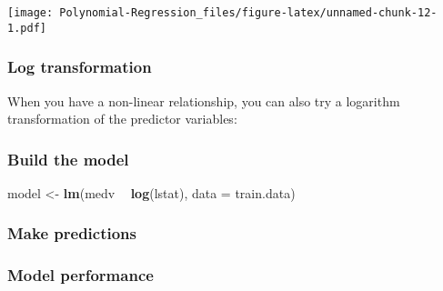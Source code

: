 \documentclass[]{article}
\newenvironment{Shaded}{\begin{snugshade}}{\end{snugshade}}
\newcommand{\DataTypeTok}[1]{\textcolor[rgb]{0.13,0.29,0.53}{#1}}
\newcommand{\KeywordTok}[1]{\textcolor[rgb]{0.13,0.29,0.53}{\textbf{#1}}}
\newcommand{\NormalTok}[1]{#1}
\newcommand{\OperatorTok}[1]{\textcolor[rgb]{0.81,0.36,0.00}{\textbf{#1}}}
\newcommand{\StringTok}[1]{\textcolor[rgb]{0.31,0.60,0.02}{#1}}
\begin{document}
\texttt{[image: Polynomial-Regression\_files/figure-latex/unnamed-chunk-12-1.pdf]}

\hypertarget{log-transformation}{%
\subsubsection{Log transformation}\label{log-transformation}}

When you have a non-linear relationship, you can also try a logarithm
transformation of the predictor variables:

\hypertarget{build-the-model}{%
\subsubsection{Build the model}\label{build-the-model}}

\begin{Shaded}
\begin{Highlighting}[]
\NormalTok{model <-}\StringTok{ }\KeywordTok{lm}\NormalTok{(medv }\OperatorTok{~}\StringTok{ }\KeywordTok{log}\NormalTok{(lstat), }\DataTypeTok{data =}\NormalTok{ train.data)}
\end{Highlighting}
\end{Shaded}

\hypertarget{make-predictions-1}{%
\subsubsection{Make predictions}\label{make-predictions-1}}

\begin{Shaded}
\end{Shaded}

\hypertarget{model-performance-1}{%
\subsubsection{Model performance}\label{model-performance-1}}

\begin{Shaded}
\end{Shaded}
\end{document}
